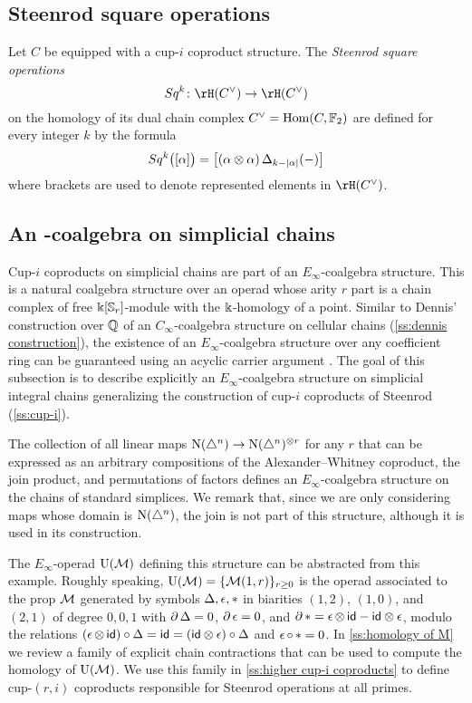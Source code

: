\subsection{Steenrod square operations} \label{ss:steenrod squares}

Let $C$ be equipped with a cup-$i$ coproduct structure.
The \textit{Steenrod square operations}
\[
Sq^k \colon \rH(C^\vee) \to \rH(C^\vee)
\]
on the homology of its dual chain complex $C^\vee = \mathrm{Hom}(C, {\mathbb{F}_2})$ are defined for every integer $k$ by the formula
\begin{equation} \label{e:steenrod squares}
Sq^k \big( [\alpha] \big) = \big[ (\alpha \otimes \alpha) \operatorname{\Delta}_{k - \lvert\alpha\rvert}(-) \big]
\end{equation}
where brackets are used to denote represented elements in $\rH(C^\vee)$.


\subsection{An \pdfEinfty-coalgebra on simplicial chains} \label{ss:e-infty generalization}

Cup-$i$ coproducts on simplicial chains are part of an $E_\infty$-coalgebra structure.
This is a natural coalgebra structure over an operad whose arity $r$ part is a chain complex of free $\Bbbk[\mathbb{S}_r]$-module with the $\Bbbk$-homology of a point.
Similar to Dennis' construction over $\mathbb{Q}$ of an $C_\infty$-coalgebra structure on cellular chains (\cref{ss:dennis construction}), the existence of an $E_\infty$-coalgebra structure over any coefficient ring can be guaranteed using an acyclic carrier argument \cite{eilenberg1953acyclic}.
The goal of this subsection is to describe explicitly an $E_\infty$-coalgebra structure on simplicial integral chains generalizing the construction of cup-$i$ coproducts of Steenrod (\cref{ss:cup-i}).

The collection of all linear maps $\operatorname{N}(\triangle^n) \to \operatorname{N}(\triangle^n)^{\otimes r}$ for any $r$ that can be expressed as an arbitrary compositions of the Alexander--Whitney coproduct, the join product, and permutations of factors defines an $E_\infty$-coalgebra structure on the chains of standard simplices.
We remark that, since we are only considering maps whose domain is $\operatorname{N}(\triangle^n)$, the join is not part of this structure, although it is used in its construction.

The $E_\infty$-operad ${\operatorname{U}(\mathcal{M})}$ defining this structure can be abstracted from this example.
Roughly speaking, ${\operatorname{U}(\mathcal{M})} = \{\mathcal{M}(1,r)\}_{r \geq 0}$ is the operad associated to the prop $\mathcal{M}$ generated by symbols $\operatorname{\Delta}, \operatorname{\epsilon}, \operatorname{\ast}$ in biarities $(1,2)$, $(1,0)$, and $(2,1)$ of degree $0,0,1$ with $\partial \operatorname{\Delta} = 0$, $\partial \operatorname{\epsilon} = 0$, and $\partial \operatorname{\ast} = \operatorname{\epsilon} \otimes \, \mathsf{id} - \mathsf{id} \otimes \operatorname{\epsilon}$, modulo the relations $(\operatorname{\epsilon} \otimes \, \mathsf{id}) \circ \operatorname{\Delta} = \mathsf{id} = (\mathsf{id} \otimes \operatorname{\epsilon}) \circ \operatorname{\Delta}$ and $\operatorname{\epsilon} \circ \, \ast = 0$.
In \cref{ss:homology of M} we review a family of explicit chain contractions that can be used to compute the homology of ${\operatorname{U}(\mathcal{M})}$.
We use this family in \cref{ss:higher cup-i coproducts} to define cup-$(r,i)$ coproducts responsible for Steenrod operations at all primes.

